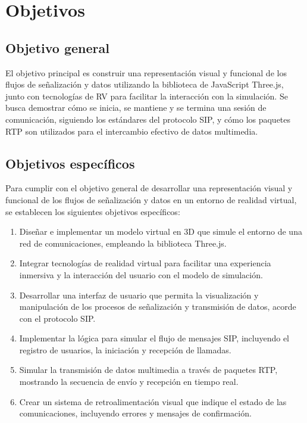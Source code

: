 \documentclass[a4paper, 12pt]{book}
\begin{document}

\cleardoublepage %
\chapter{Objetivos} %
\label{chap:objetivos} %

\section{Objetivo general} %
\label{sec:objetivo-general} %

El objetivo principal es construir una representación visual y funcional de los flujos de señalización y 
datos utilizando la biblioteca de JavaScript Three.js, junto con tecnologías de RV para facilitar la interacción con la simulación. 
Se busca demostrar cómo se inicia, se mantiene y se termina una sesión de comunicación, siguiendo los estándares del protocolo SIP, 
y cómo los paquetes RTP son utilizados para el intercambio efectivo de datos multimedia.


\section{Objetivos específicos}
\label{sec:objetivos-especificos}
Para cumplir con el objetivo general de desarrollar una representación visual y funcional de los flujos de señalización 
y datos en un entorno de realidad virtual, se establecen los siguientes objetivos específicos:

\begin{enumerate}
\item Diseñar e implementar un modelo virtual en 3D que simule el entorno de una red de comunicaciones, empleando la biblioteca Three.js.
\item Integrar tecnologías de realidad virtual para facilitar una experiencia inmersiva y 
la interacción del usuario con el modelo de simulación.
\item Desarrollar una interfaz de usuario que permita la visualización y manipulación de los procesos de 
señalización y transmisión de datos, acorde con el protocolo SIP.
\item Implementar la lógica para simular el flujo de mensajes SIP, incluyendo el registro de usuarios, la iniciación y 
recepción de llamadas.
\item Simular la transmisión de datos multimedia a través de paquetes RTP, mostrando la secuencia de envío y recepción en tiempo real.
\item Crear un sistema de retroalimentación visual que indique el estado de las comunicaciones, incluyendo errores y mensajes de confirmación.
\end{enumerate}
\end{document}
